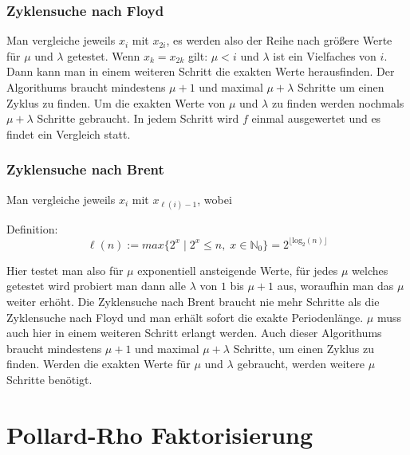 \documentclass{beamer}
\begin{document}
\begin{frame}
	\frametitle{Zyklensuche nach Floyd}
	Man vergleiche jeweils \(x_i\) mit \(x_{2 i}\),
	es werden also der Reihe nach größere Werte für \(\mu\) und \(\lambda\) getestet.
	Wenn \(x_k = x_{2 k}\) gilt: \(\mu < i\) und \(\lambda\) ist ein Vielfaches von \(i\).
	Dann kann man in einem weiteren Schritt die exakten Werte herausfinden.
	Der Algorithums braucht mindestens \(\mu + 1\) und maximal \(\mu + \lambda\) Schritte um einen Zyklus zu finden.
	Um die exakten Werte von \(\mu\) und \(\lambda\) zu finden werden nochmals \(\mu + \lambda\) Schritte gebraucht.
	In jedem Schritt wird \(f\) einmal ausgewertet und es findet ein Vergleich statt.
	
\end{frame}


\begin{frame}
	\frametitle{Zyklensuche nach Brent}
	
	Man vergleiche jeweils \(x_i\) mit \(x_{\ell(i)-1}\), wobei
	\begin{block}{Definition:}
		\[
			\ell(n) := max \{ 2^x \;|\; 2^x \leq n,\; x\in \mathbb N_0\} = 2^{\lfloor \operatorname{log_2}(n) \rfloor}
		\]
	\end{block}
	Hier testet man also für \(\mu\) exponentiell ansteigende Werte, für jedes \(\mu\) welches getestet wird
	probiert man dann alle \(\lambda\) von \(1\) bis \(\mu + 1\) aus, woraufhin man das \(\mu\) weiter erhöht.
	Die Zyklensuche nach Brent braucht nie mehr Schritte als die Zyklensuche nach Floyd und man erhält sofort die exakte Periodenlänge.
	\(\mu\) muss auch hier in einem weiteren Schritt erlangt werden.
	Auch dieser Algorithums braucht mindestens \(\mu + 1\) und maximal \(\mu + \lambda\) Schritte, um einen Zyklus zu finden.
	Werden die exakten Werte für \(\mu\) und \(\lambda\) gebraucht, werden weitere \( \mu \) Schritte benötigt.
\end{frame}


\section{Pollard-Rho Faktorisierung}

\end{document}
